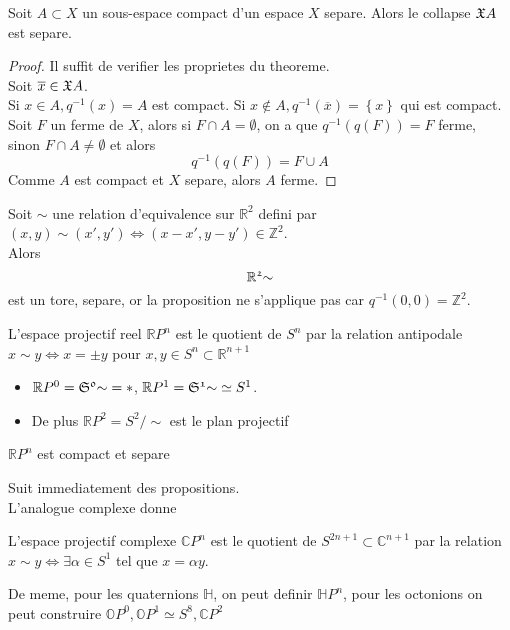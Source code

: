 \documentclass[../main.tex]{subfiles}
\begin{document}
\begin{crly}
Soit $A \subset X$ un sous-espace compact d'un espace $X$ separe. Alors le collapse $ \frak X A$ est separe.
\end{crly}
\begin{proof}
Il suffit de verifier les proprietes du theoreme.\\
Soit $\overline{x} \in \frak X A$.\\
Si $x\in A, q^{-1}( x) =A$ est compact. Si $x\notin A, q^{-1}( \overline{x})= \left\{ x \right\}  $ qui est compact.\\
Soit $F$ un ferme de $X$, alors si $F\cap A= \emptyset$, on a que $q^{-1}( q( F) ) = F$ ferme, sinon $F\cap A \neq \emptyset$ et alors
\[ 
q^{-1}( q( F) ) = F\cup A
\]
Comme $A$ est compact et $X$ separe, alors $A$ ferme.
\end{proof}
\begin{exemple}
Soit $\sim$ une relation d'equivalence sur $ \mathbb{R}^{2}$ defini par $ ( x,y) \sim ( x',y') \iff ( x-x',y-y') \in \mathbb{Z}^{2}$.\\
Alors 
\[ 
\frak { \mathbb{R}^{2}} { \sim} 
\]
est un tore, separe, or la proposition ne s'applique pas car $ q^{-1}( 0,0) = \mathbb{Z}^{2}$.
\end{exemple}
\begin{defn}
	L'espace projectif reel $ \mathbb{R}P^{n}$ est le quotient de $ S^{n}$ par la relation antipodale $ x\sim y \iff x= \pm y$ pour $x,y \in S^{n} \subset  \mathbb{R}^{n+1}$ 
\end{defn}
\begin{exemple}
	\begin{itemize}
	\item 
	
$ \mathbb{R}P^{0}= \frak { S^{0} } { \sim} = \ast$, $ \mathbb{R}P^{1}= \frak { S^{1} } { \sim} \simeq S^{1}$.\\
\item De plus $ \mathbb{R}P^{2}= S^{2} /\sim$ est le plan projectif 
	\end{itemize}
\end{exemple}
\begin{propo}
$ \mathbb{R}P^{n}$ est compact et separe
\end{propo}
Suit immediatement des propositions.\\
L'analogue complexe donne
\begin{defn}
	L'espace projectif complexe $ \mathbb{C}P^{n}$ est le quotient de $S^{2n+1}\subset \mathbb{C}^{n+1}$ par la relation $x\sim y \iff \exists \alpha \in S^{1}$ tel que $x= \alpha y$.
\end{defn}
De meme, pour les quaternions $ \mathbb{H}$, on peut definir $ \mathbb{H}P^{n}$, pour les octonions on peut construire $ \mathbb{O}P^{0}, \mathbb{O}P^{1}\simeq S^{8}, \mathbb{C}P^{2}$ 
\end{document}
